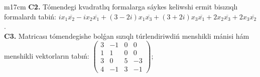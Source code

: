 \documentclass{article}
\begin{document}
\begin{tabular}{m{17cm}}
\textbf{C2.} Tómendegi kvadratlıq formalarga sáykes keliwshi ermit bisızıqlı formalardı tabiń: \(ix_{1}\overline{x_{2}} - ix_{2}\overline{x_{1}} + (3 - 2i)x_{1}\overline{x_{3}} + (3 + 2i)x_{3}\overline{x_{1}} + 2x_{2}\overline{x_{3}} + 2x_{3}\overline{x_{2}}\). \\
\textbf{C3.} Matricası tómendegishe bolǵan sızıqlı túrlendiriwdiń menshikli mánisi hám menshikli vektorların tabıń: \(\begin{pmatrix} 3 & - 1 & 0 & 0 \\ 1 & 1 & 0 & 0 \\ 3 & 0 & 5 & - 3 \\ 4 & - 1 & 3 & - 1 \end{pmatrix}\); \\

\end{tabular}
\vspace{1cm}
\end{document}
